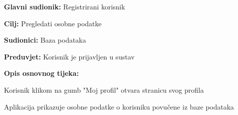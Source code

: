 					\noindent {}
					\begin{packed_item}
	
						\item \textbf{Glavni sudionik: } Registrirani korisnik
						\item  \textbf{Cilj:} Pregledati osobne podatke
						\item  \textbf{Sudionici:} Baza podataka
						\item  \textbf{Preduvjet:} Korisnik je prijavljen u sustav
						\item  \textbf{Opis osnovnog tijeka:}
						
						\item[] \begin{packed_enum}
	
							\item Korisnik klikom na gumb "Moj profil" otvara stranicu svog profila
							\item Aplikacija prikazuje osobne podatke o korisniku povučene iz baze podataka
					
						\end{packed_enum}
			
					\end{packed_item}

